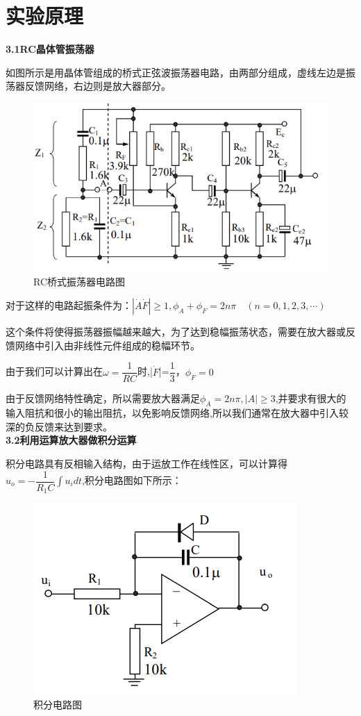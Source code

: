 \documentclass[a4 paper,12pt]{article}
\begin{document}
	\section{实验原理}
    \noindent
\textbf{3.1\quad RC晶体管振荡器}
\par 如图所示是用晶体管组成的桥式正弦波振荡器电路，由两部分组成，虚线左边是振荡器反馈网络，右边则是放大器部分。
		\begin{figure}[H]
		\centering
		\hspace{2em}\includegraphics[width=.5\linewidth]{pic/1.png}
		\caption{\small{RC桥式振荡器电路图}
		}
	\end{figure}
    \par 对于这样的电路起振条件为：$|\dot{A}\dot{F}|\geq1,\phi_{A}+\phi_{F}=2n\pi \quad(n=0,1,2,3,\cdots)$
    \par 这个条件将使得振荡器振幅越来越大，为了达到稳幅振荡状态，需要在放大器或反馈网络中引入由非线性元件组成的稳幅环节。
    \par 由于我们可以计算出在$\omega=\dfrac{1}{RC}$时,|$\dot{F}$|=$\dfrac{1}{3}$，$\phi_{F}=0$
    \par 由于反馈网络特性确定，所以需要放大器满足$\phi_{A}=2n\pi,|A|\geq3$,并要求有很大的输入阻抗和很小的输出阻抗，以免影响反馈网络,所以我们通常在放大器中引入较深的负反馈来达到要求。\\
    \textbf{3.2\quad 利用运算放大器做积分运算}
    \par 积分电路具有反相输入结构，由于运放工作在线性区，可以计算得$u_{o}=-\dfrac{1}{R_{1}C}\int u_{i} dt$,积分电路图如下所示：
 		\begin{figure}[H]
 		\centering
 		\hspace{2em}\includegraphics[width=.5\linewidth]{pic/2.png}
 		\caption{\small{积分电路图}
 		}
 	\end{figure}   
\end{document}
